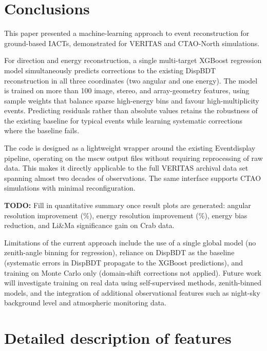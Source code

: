 \documentclass[12pt]{article}
\newcommand{\todo}[1]{\begin{hintBox} \textbf{TODO:} #1 \end{hintBox}}
\begin{document}
\section{Conclusions}
\label{sec:conclusions}

This paper presented a machine-learning approach to event reconstruction for ground-based IACTs, demonstrated for VERITAS and
CTAO-North simulations.

For direction and energy reconstruction, a single multi-target XGBoost regression model
simultaneously predicts corrections to the existing DispBDT reconstruction
in all three coordinates (two angular and one energy).
The model is trained on more than 100 image, stereo, and array-geometry features,
using sample weights that balance sparse high-energy bins and favour high-multiplicity events.
Predicting residuals rather than absolute values retains the robustness of the
existing baseline for typical events while learning systematic corrections where the
baseline fails.

The code is designed as a lightweight wrapper around the existing Eventdisplay
pipeline, operating on the mscw output files without requiring reprocessing
of raw data.
This makes it directly applicable to the full VERITAS archival data set
spanning almost two decades of observations.
The same interface supports CTAO simulations with minimal reconfiguration.

\todo{Fill in quantitative summary once result plots are generated: angular resolution improvement (\%), energy resolution improvement (\%), energy bias reduction, and Li\&Ma significance gain on Crab data.}

Limitations of the current approach include the use of a single global model
(no zenith-angle binning for regression), reliance on DispBDT as the baseline
(systematic errors in DispBDT propagate to the XGBoost predictions),
and training on Monte Carlo only (domain-shift corrections not applied).
Future work will investigate training on real data using self-supervised methods,
zenith-binned models, and the integration of additional observational features
such as night-sky background level and atmospheric monitoring data.



\section{Detailed description of features}
\label{sec:appendix_features}
\end{document}
